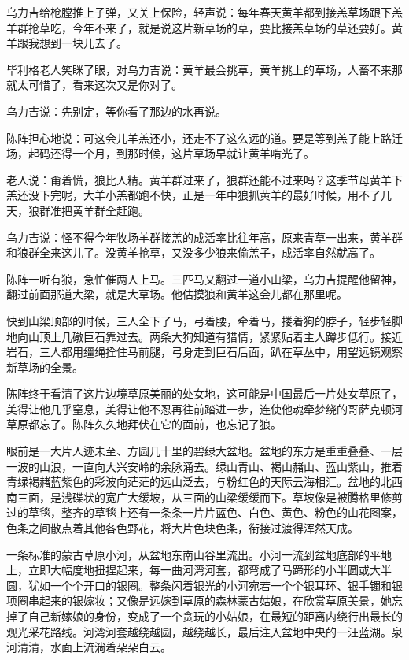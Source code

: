 \par 乌力吉给枪膛推上子弹，又关上保险，轻声说：每年春天黄羊都到接羔草场跟下羔羊群抢草吃，今年不来了，就是说这片新草场的草，要比接羔草场的草还要好。黄羊跟我想到一块儿去了。
\par 毕利格老人笑眯了眼，对乌力吉说：黄羊最会挑草，黄羊挑上的草场，人畜不来那就太可惜了，看来这次又是你对了。
\par 乌力吉说：先别定，等你看了那边的水再说。
\par 陈阵担心地说：可这会儿羊羔还小，还走不了这么远的道。要是等到羔子能上路迁场，起码还得一个月，到那时候，这片草场早就让黄羊啃光了。
\par 老人说：甭着慌，狼比人精。黄羊群过来了，狼群还能不过来吗？这季节母黄羊下羔还没下完呢，大羊小羔都跑不快，正是一年中狼抓黄羊的最好时候，用不了几天，狼群准把黄羊群全赶跑。
\par 乌力吉说：怪不得今年牧场羊群接羔的成活率比往年高，原来青草一出来，黄羊群和狼群全来这儿了。没黄羊抢草，又没多少狼来偷羔子，成活率自然就高了。
\par 陈阵一听有狼，急忙催两人上马。三匹马又翻过一道小山梁，乌力吉提醒他留神，翻过前面那道大梁，就是大草场。他估摸狼和黄羊这会儿都在那里呢。
\par 快到山梁顶部的时候，三人全下了马，弓着腰，牵着马，搂着狗的脖子，轻步轻脚地向山顶上几礅巨石靠过去。两条大狗知道有猎情，紧紧贴着主人蹲步低行。接近岩石，三人都用缰绳拴住马前腿，弓身走到巨石后面，趴在草丛中，用望远镜观察新草场的全景。
\par 陈阵终于看清了这片边境草原美丽的处女地，这可能是中国最后一片处女草原了，美得让他几乎窒息，美得让他不忍再往前踏进一步，连使他魂牵梦绕的哥萨克顿河草原都忘了。陈阵久久地拜伏在它的面前，也忘记了狼。
\par 眼前是一大片人迹未至、方圆几十里的碧绿大盆地。盆地的东方是重重叠叠、一层一波的山浪，一直向大兴安岭的余脉涌去。绿山青山、褐山赭山、蓝山紫山，推着青绿褐赭蓝紫色的彩波向茫茫的远山泛去，与粉红色的天际云海相汇。盆地的北西南三面，是浅碟状的宽广大缓坡，从三面的山梁缓缓而下。草坡像是被腾格里修剪过的草毯，整齐的草毯上还有一条条一片片蓝色、白色、黄色、粉色的山花图案，色条之间散点着其他各色野花，将大片色块色条，衔接过渡得浑然天成。
\par 一条标准的蒙古草原小河，从盆地东南山谷里流出。小河一流到盆地底部的平地上，立即大幅度地扭捏起来，每一曲河湾河套，都弯成了马蹄形的小半圆或大半圆，犹如一个个开口的银圈。整条闪着银光的小河宛若一个个银耳环、银手镯和银项圈串起来的银嫁妆；又像是远嫁到草原的森林蒙古姑娘，在欣赏草原美景，她忘掉了自己新嫁娘的身份，变成了一个贪玩的小姑娘，在最短的距离内绕行出最长的观光采花路线。河湾河套越绕越圆，越绕越长，最后注入盆地中央的一汪蓝湖。泉河清清，水面上流淌着朵朵白云。
